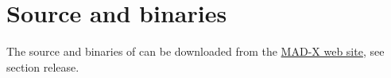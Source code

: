 
\section{Source and binaries}
\label{sec:source}

 The source and binaries of \madx can be downloaded from the
 \href{http://cern.ch/madx}{MAD-X web site}, see section release.   

% 
% 
% 
% 
% 
% 

